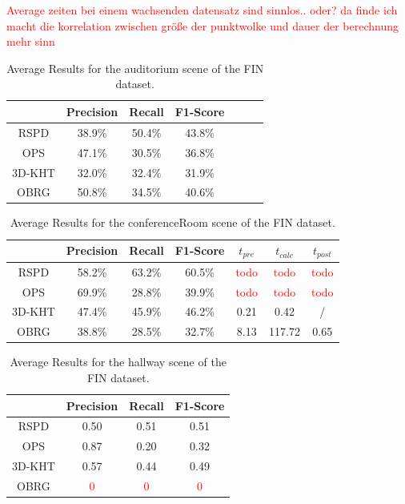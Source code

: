 \documentclass[main.tex]{subfiles}
\begin{document}
\textcolor{red}{Average zeiten bei einem wachsenden datensatz sind sinnlos.. oder? da finde ich macht die korrelation zwischen größe 
der punktwolke und dauer der berechnung mehr sinn}


\begin{table}[]
    \centering
    \begin{tabular}{c|cccccc}
               & Precision & Recall & F1-Score \\ \hline
        RSPD   & 38.9\%    & 50.4\% & 43.8\%   \\
        OPS    & 47.1\%    & 30.5\% & 36.8\%   \\
        3D-KHT & 32.0\%    & 32.4\% & 31.9\%   \\
        OBRG   & 50.8\%    & 34.5\% & 40.6\%
    \end{tabular}%
    \caption{Average Results for the auditorium scene of the FIN dataset.}
    \label{tab:res-fin-audi}
\end{table}

\begin{table}[]
    \centering
    \begin{tabular}{c|cccccc}
               & Precision & Recall & F1-Score & $t_{pre}$             & $t_{calc}$            & $t_{post}$            \\ \hline
        RSPD   & 58.2\%    & 63.2\% & 60.5\%   & \textcolor{red}{todo} & \textcolor{red}{todo} & \textcolor{red}{todo} \\
        OPS    & 69.9\%    & 28.8\% & 39.9\%   & \textcolor{red}{todo} & \textcolor{red}{todo} & \textcolor{red}{todo} \\
        3D-KHT & 47.4\%    & 45.9\% & 46.2\%   & 0.21                  & 0.42                  & /                     \\
        OBRG   & 38.8\%    & 28.5\% & 32.7\%   & 8.13                  & 117.72                & 0.65
    \end{tabular}%
    \caption{Average Results for the conferenceRoom scene of the FIN dataset.}
    \label{tab:res-fin-conf}
\end{table}

\begin{table}[]
    \centering
    \begin{tabular}{c|ccc}
               & Precision          & Recall             & F1-Score           \\ \hline
        RSPD   & 0.50               & 0.51               & 0.51               \\
        OPS    & 0.87               & 0.20               & 0.32               \\
        3D-KHT & 0.57               & 0.44               & 0.49               \\
        OBRG   & \textcolor{red}{0} & \textcolor{red}{0} & \textcolor{red}{0}
    \end{tabular}%
    \caption{Average Results for the hallway scene of the FIN dataset.}
    \label{tab:res-fin-hall}
\end{table}
\end{document}
